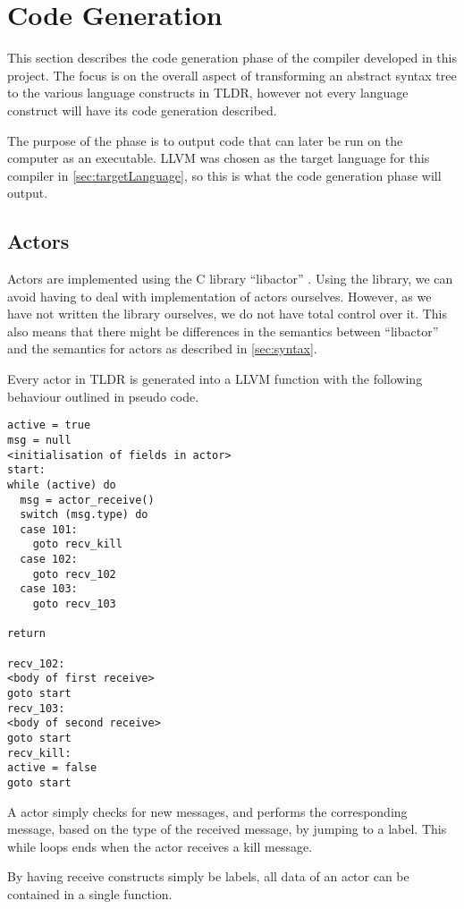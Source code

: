 \section{Code Generation}

This section describes the code generation phase of the compiler developed in this project. The focus is on the overall aspect of transforming an abstract syntax tree to the various language constructs in TLDR, however not every language construct will have its code generation described. 

The purpose of the phase is to output code that can later be run on the computer as an executable. LLVM was chosen as the target language for this compiler in \cref{sec:targetLanguage}, so this is what the code generation phase will output. 

\subsection{Actors}

Actors are implemented using the C library \enquote{libactor} \cite{libactor}. Using the library, we can avoid having to deal with implementation of actors ourselves. However, as we have not written the library ourselves, we do not have total control over it. This also means that there might be differences in the semantics between \enquote{libactor} and the semantics for actors as described in \cref{sec:syntax}.

Every actor in TLDR is generated into a LLVM function with the following behaviour outlined in pseudo code.

\begin{verbatim}
active = true
msg = null
<initialisation of fields in actor>
start:
while (active) do
  msg = actor_receive()
  switch (msg.type) do
  case 101:
    goto recv_kill
  case 102:
    goto recv_102
  case 103:
    goto recv_103

return

recv_102:
<body of first receive>
goto start 
recv_103:
<body of second receive>
goto start 
recv_kill:
active = false
goto start
\end{verbatim}

A actor simply checks for new messages, and performs the corresponding message, based on the type of the received message, by jumping to a label. This while loops ends when the actor receives a kill message.

By having receive constructs simply be labels, all data of an actor can be contained in a single function.

